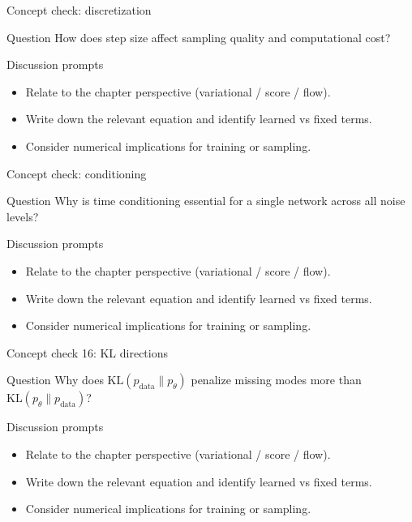 \documentclass[aspectratio=169]{beamer}
\begin{document}
\begin{frame}{Concept check: discretization}
\begin{block}{Question}
How does step size affect sampling quality and computational cost?
\end{block}
\begin{block}{Discussion prompts}
\begin{itemize}
\item Relate to the chapter perspective (variational / score / flow).
\item Write down the relevant equation and identify learned vs fixed terms.
\item Consider numerical implications for training or sampling.
\end{itemize}
\end{block}
\end{frame}

\begin{frame}{Concept check: conditioning}
\begin{block}{Question}
Why is time conditioning essential for a single network across all noise levels?
\end{block}
\begin{block}{Discussion prompts}
\begin{itemize}
\item Relate to the chapter perspective (variational / score / flow).
\item Write down the relevant equation and identify learned vs fixed terms.
\item Consider numerical implications for training or sampling.
\end{itemize}
\end{block}
\end{frame}

\begin{frame}{Concept check 16: KL directions}
\begin{block}{Question}
Why does \(\mathrm{KL}(p_{\text{data}}\|p_\theta)\) penalize missing modes more than \(\mathrm{KL}(p_\theta\|p_{\text{data}})\)?
\end{block}
\begin{block}{Discussion prompts}
\begin{itemize}
\item Relate to the chapter perspective (variational / score / flow).
\item Write down the relevant equation and identify learned vs fixed terms.
\item Consider numerical implications for training or sampling.
\end{itemize}
\end{block}
\end{frame}
\end{document}
